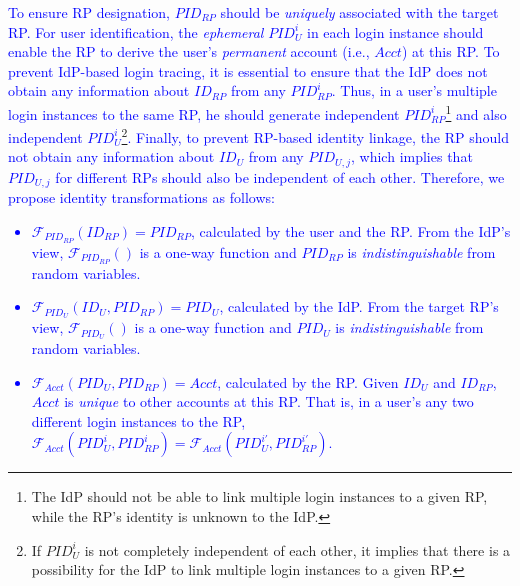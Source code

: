 \textcolor{blue}{To ensure RP designation, $PID_{RP}$ should be \emph{uniquely} associated with the target RP.
For user identification, the \emph{ephemeral} $PID_{U}^i$ in each login instance should enable the RP to derive the user's \emph{permanent} account  (i.e., $Acct$) at this RP.
To prevent IdP-based login tracing, it is essential to ensure that the IdP does not obtain any information about $ID_{RP}$ from any $PID_{RP}^i$.
Thus, in a user's multiple login instances to the same RP, he should generate independent $PID_{RP}^i$\footnote{The IdP should not be able to link multiple login instances to a given RP, while the RP's identity is unknown to the IdP.} %
and also independent $PID_U^i$\footnote{If $PID_U^i$ is not completely independent of each other, it implies that there is a possibility for the IdP to link multiple login instances to a given RP.}.
Finally, to prevent RP-based identity linkage,
the RP should not obtain any information about $ID_U$ from any $PID_{U,j}$, which implies that $PID_{U,j}$ for different RPs should also be independent of each other.
Therefore, we propose identity transformations as follows:
\vspace{-\topsep}\begin{itemize}
\setlength{\topsep}{0pt}
\setlength{\partopsep}{0pt}
\setlength{\itemsep}{0pt}
\setlength{\parsep}{0pt}
\setlength{\parskip}{0pt}
\item
$\mathcal{F}_{PID_{RP}}(ID_{RP}) = PID_{RP}$, calculated by the user and the RP.
From the IdP's view,
$\mathcal{F}_{PID_{RP}}()$ is a one-way function and $PID_{RP}$
is \emph{indistinguishable} from random variables.
\item
$\mathcal{F}_{PID_U}(ID_U, PID_{RP}) = PID_{U}$, calculated by the IdP.
From the target RP's view,
    $\mathcal{F}_{PID_U}()$ is a one-way function and $PID_{U}$ is \emph{indistinguishable} from random variables.
\item
$\mathcal{F}_{Acct}(PID_{U}, PID_{RP}) = Acct$, calculated by the RP.
Given $ID_U$ and $ID_{RP}$, $Acct$ is %
\emph{unique} to other accounts at this RP.
That is, in a user's any two different login instances to the RP,
 $\mathcal{F}_{Acct}(PID_{U}^i, PID_{RP}^i) = \mathcal{F}_{Acct}(PID_{U}^{i'}, PID_{RP}^{i'})$.
\end{itemize}}

